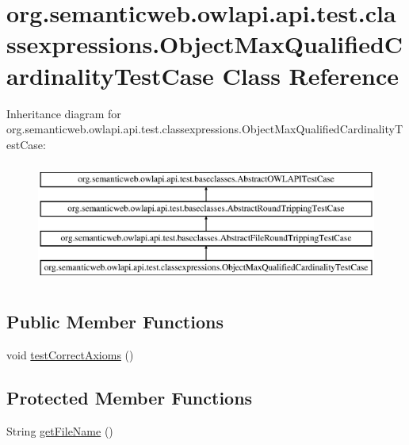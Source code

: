 \hypertarget{classorg_1_1semanticweb_1_1owlapi_1_1api_1_1test_1_1classexpressions_1_1_object_max_qualified_cardinality_test_case}{\section{org.\-semanticweb.\-owlapi.\-api.\-test.\-classexpressions.\-Object\-Max\-Qualified\-Cardinality\-Test\-Case Class Reference}
\label{classorg_1_1semanticweb_1_1owlapi_1_1api_1_1test_1_1classexpressions_1_1_object_max_qualified_cardinality_test_case}
}
Inheritance diagram for org.\-semanticweb.\-owlapi.\-api.\-test.\-classexpressions.\-Object\-Max\-Qualified\-Cardinality\-Test\-Case\-:\begin{figure}[H]
\begin{center}
\leavevmode
\includegraphics[height=4.000000cm]{classorg_1_1semanticweb_1_1owlapi_1_1api_1_1test_1_1classexpressions_1_1_object_max_qualified_cardinality_test_case}
\end{center}
\end{figure}
\subsection*{Public Member Functions}
\begin{DoxyCompactItemize}
\item 
void \hyperlink{classorg_1_1semanticweb_1_1owlapi_1_1api_1_1test_1_1classexpressions_1_1_object_max_qualified_cardinality_test_case_a72b8e3eced12b5ba51ebc6f43a15a1a0}{test\-Correct\-Axioms} ()
\end{DoxyCompactItemize}
\subsection*{Protected Member Functions}
\begin{DoxyCompactItemize}
\item 
String \hyperlink{classorg_1_1semanticweb_1_1owlapi_1_1api_1_1test_1_1classexpressions_1_1_object_max_qualified_cardinality_test_case_acd8993be9510b37ef1e35fdb3a138202}{get\-File\-Name} ()
\end{DoxyCompactItemize}


